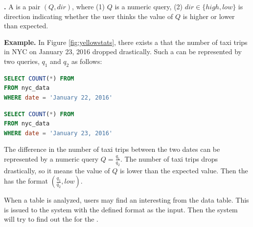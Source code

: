{\bf {\Fact}.} A {\fact} is a pair $(Q, dir)$, where (1) $Q$ is a numeric query, (2) $dir \in \{high, low\}$ is direction indicating whether the user thinks the value of $Q$ is higher or lower than expected.

{\bf Example.} In Figure \ref{fig:yellowstats}, there exists a {\fact} that the number of taxi trips in NYC on January 23, 2016 dropped drastically. Such a {\fact} can be represented by two queries, $q_1$ and $q_2$ as follows:

\renewcommand{\lstlistingname}{Query}%
\begin{lstlisting}[language=SQL, caption=Aggregate Query for the number of taxi trips on January 22, label=qry:aggregateexample1]
SELECT COUNT(*) FROM
FROM nyc_data
WHERE date = 'January 22, 2016'
\end{lstlisting}
\renewcommand{\lstlistingname}{Query}%
\begin{lstlisting}[language=SQL, caption=Aggregate Query for the number of taxi trips on January 23, label=qry:aggregateexample2]
SELECT COUNT(*) FROM
FROM nyc_data
WHERE date = 'January 23, 2016'
\end{lstlisting}
The difference in the number of taxi trips between the two dates can be represented by a numeric query $Q = \frac{q_1}{q_2}$. The number of taxi trips drops drastically, so it means the value of $Q$ is lower than the expected value. Then the {\fact} has the format $(\frac{q_1}{q_2}, low)$.

When a table is analyzed, users may find an interesting {\fact} from the data table. This {\fact} is issued to the system with the defined format as the input. Then the system will try to find out the {\explanation} for the {\fact}.


